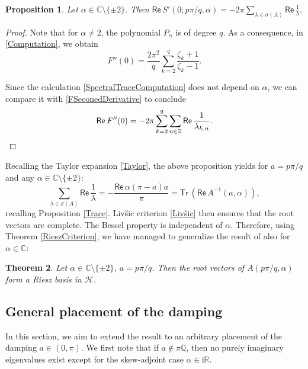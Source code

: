 \documentclass[11pt, a4paper,reqno]{amsart}
\theoremstyle{plain}
\newtheorem{theorem}{{Theorem}}[section]
\newtheorem{proposition}[theorem]{Proposition}
\theoremstyle{definition}
\theoremstyle{remark}
\newcommand{\1}{\mathds 1}
\renewcommand{\Re}{\mathsf{Re}\,}
\newcommand{\Tr}{\mathsf{Tr}\,}
\begin{document}
\begin{proposition}
    Let $\alpha \in \mathbb C \setminus\{\pm 2\}.$ Then 
    $
    \Re S'(0; p\pi/q, \alpha) = -2\pi\sum_{\lambda\in\sigma(A)}\Re \frac{1}{\lambda}.
    $
\end{proposition}
\begin{proof}
    Note that for $\alpha \neq 2$, the polynomial $P_\alpha$ is of degree $q$. As a consequence, in \eqref{Computation}, we obtain
    \begin{equation}
    F''(0) = \frac{2\pi^2}{q}\sum_{k=2}^q\frac{\zeta_k+1}{\zeta_k-1}.
    \label{FSeconedDerivative}
    \end{equation}

    Since the calculation \eqref{SpectralTraceComputation} does not depend on $\alpha$, we can compare it with \eqref{FSeconedDerivative} to conclude
    \[
    \Re F''(0) = -2\pi \sum_{k=2}^q\sum_{n \in \mathbb Z}\Re \frac{1}{\lambda_{k,n}}. \qedhere
    \]
\end{proof}

Recalling the Taylor expansion \eqref{Taylor}, the above proposition yields for $a = p\pi/q$ and any $\alpha \in \mathbb C \setminus \{\pm2\}$:
\begin{equation}
\sum_{\lambda\in\sigma(A)}\Re\frac{1}{\lambda} = -\frac{\Re\alpha(\pi-a)a}{\pi} = \Tr\left(\Re A^{-1}(a, \alpha)\right),
\label{SpectralTraceGeneral}
\end{equation}
recalling Proposition \ref{Trace}.
Livšic criterion \ref{Livšic} then ensures that the root vectors are complete. The Bessel property is independent of $\alpha$. Therefore, using Theorem \ref{RieszCriterion}, we have managed to generalize the result of \cite{CH} also for $\alpha \in \mathbb C$:

\begin{theorem}
    Let $\alpha \in \mathbb C \setminus\{\pm 2\}$, $a = p\pi/q$. Then the root vectors of $A(p\pi/q, \alpha)$ form a Riesz basis in $\mathcal H$.
\end{theorem}

\subsection{General placement of the damping}
In this section, we aim to extend the result to an arbitrary placement of the damping $a \in (0, \pi)$. We first note that if $a \notin \pi\mathbb Q$, then no purely imaginary eigenvalues exist except for the skew-adjoint case $\alpha \in \mathrm{i}\mathbb R$.
\end{document}
